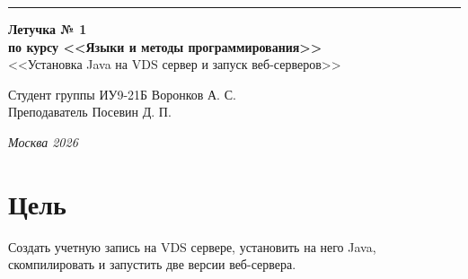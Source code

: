 \documentclass[a4paper, 14pt]{extarticle}
\begin{document}
\begin{titlepage}
\vspace*{-16pt}
\hspace{30pt}\rule{0.866\textwidth}{0.4pt}
  
\vspace{11em}

\begin{center}
\Large {\bf Летучка № 1} \\ 
\large {\bf по курсу <<Языки и методы программирования>>} \\ 
\large <<Установка Java на VDS сервер и запуск веб-серверов>>
\end{center}\normalsize

\vspace{8em}


\begin{flushright}
  {Студент группы ИУ9-21Б Воронков А. С.\hspace*{15pt} \\
  \vspace{2ex}
  Преподаватель Посевин Д. П.\hspace*{15pt}}
\end{flushright}

\bigskip

\vfill
 

\begin{center}
\textsl{Москва 2026}
\end{center}
\end{titlepage}

\renewcommand{\ttdefault}{pcr}

\setlength{\tabcolsep}{3pt}
\newpage
\setcounter{page}{2}

\section{Цель}\label{Sect::task}
\par
Создать учетную запись на VDS сервере, установить на него Java, скомпилировать и запустить две версии веб-сервера.
\pagebreak
\end{document}
